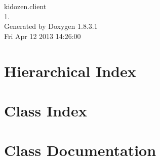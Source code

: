 \documentclass{book}
\begin{document}
\hypersetup{pageanchor=false,citecolor=blue}
\begin{titlepage}
\vspace*{7cm}
\begin{center}
{\Large kidozen.\-client \\[1ex]\large 1. }\\
\vspace*{1cm}
{\large Generated by Doxygen 1.8.3.1}\\
\vspace*{0.5cm}
{\small Fri Apr 12 2013 14:26:00}\\
\end{center}
\end{titlepage}
\clearemptydoublepage
{}
\tableofcontents
\clearemptydoublepage
{}
\hypersetup{pageanchor=true,citecolor=blue}
\chapter{Hierarchical Index}

\chapter{Class Index}

\chapter{Class Documentation}



































\printindex
\end{document}

